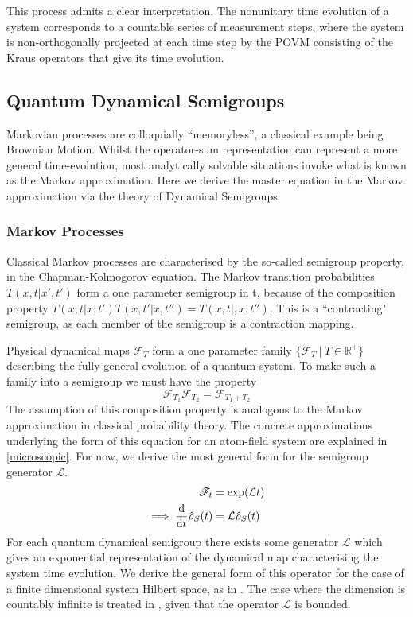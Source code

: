 This process admits a clear interpretation.
The nonunitary time evolution of a system corresponds to a countable series of measurement steps, where the system is non-orthogonally projected at each time step by the POVM consisting of the Kraus operators that give its time evolution.

\subsection{Quantum Dynamical Semigroups}
Markovian processes are colloquially ``memoryless'', a classical example being Brownian Motion.
Whilst the operator-sum representation can represent a more general time-evolution, most analytically solvable situations invoke what is known as the Markov approximation.
Here we derive the master equation in the Markov approximation via the theory of Dynamical Semigroups.

\subsubsection{Markov Processes}
Classical Markov processes are characterised by the so-called semigroup property, in the Chapman-Kolmogorov equation.
The Markov transition probabilities $T(x, t|x', t')$ form a one parameter semigroup in t, because of the composition property $T(x, t|x, t')T(x, t'|x, t'') = T(x, t|,x, t'')$.  
This is a ``contracting" semigroup, as each member of the semigroup is a contraction mapping.

Physical dynamical maps $\mathscr{F}_T$ form a one parameter family $\{\mathscr{F}_T\ |\ T \in \mathbb{R^+}\}$ describing the fully general evolution of a quantum system. 
To make such a family into a semigroup we must have the property 
\begin{equation}
  \mathscr{F}_{T_1} \mathscr{F}_{T_2} = \mathscr{F}_{T_1+T_2}
\end{equation}
The assumption of this composition property is analogous to the Markov approximation in classical probability theory.
The concrete approximations underlying the form of this equation for an atom-field system are explained in \cref{microscopic}.
For now, we derive the most general form for the semigroup generator $\mathcal{L}$.
\begin{align*}
  \mathscr{F}_t &= \exp(\mathcal{L}t)\\
  \implies \dv{t} \hat{\rho}_S(t) &= \mathcal{L} \hat{\rho}_S(t)
\end{align*}
For each quantum dynamical semigroup there exists some generator $\mathcal{L}$ which gives an exponential representation of the dynamical map characterising the system time evolution.
We derive the general form of this operator for the case of a finite dimensional system Hilbert space, as in \cite{Breuer2002}. 
The case where the dimension is countably infinite is treated in \cite{Lindblad1976}, given that the operator $\mathcal{L}$ is bounded.

